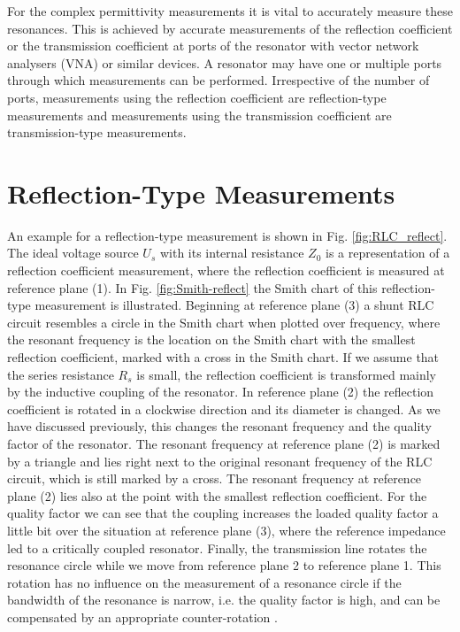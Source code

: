 For the complex permittivity measurements it is vital to accurately measure these resonances. This is achieved by accurate measurements of the reflection coefficient or the transmission coefficient at ports of the resonator with vector network analysers (VNA) or similar devices. A resonator may have one or multiple ports through which measurements can be performed. Irrespective of the number of ports, measurements using the reflection coefficient are reflection-type measurements and measurements using the transmission coefficient are transmission-type measurements. 

\section{Reflection-Type Measurements}
An example for a reflection-type measurement is shown in Fig. \ref{fig:RLC_reflect}. The ideal voltage source $U_s$ with its internal resistance $Z_0$ is a representation of a reflection coefficient measurement, where the reflection coefficient is measured at reference plane (1). In Fig. \ref{fig:Smith-reflect} the Smith chart of this reflection-type measurement is illustrated. Beginning at reference plane (3) a shunt RLC circuit resembles a circle in the Smith chart when plotted over frequency, where the resonant frequency is the location on the Smith chart with the smallest reflection coefficient, marked with a cross in the Smith chart. If we assume that the series resistance $R_s$ is small, the reflection coefficient is transformed mainly by the inductive coupling of the resonator. In reference plane (2) the reflection coefficient is rotated in a clockwise direction and its diameter is changed. As we have discussed previously, this changes the resonant frequency and the quality factor of the resonator.  The resonant frequency at reference plane (2) is marked by a triangle and lies right next to the original resonant frequency of the RLC circuit, which is still marked by a cross. The resonant frequency at reference plane (2) lies also at the point with the smallest reflection coefficient. For the quality factor we can see that the coupling increases the loaded quality factor a little bit over the situation at reference plane (3), where the reference impedance led to a critically coupled resonator. Finally, the transmission line rotates the resonance circle while we move from reference plane 2 to reference plane 1. This rotation has no influence on the measurement of a resonance circle if the bandwidth of the resonance is narrow, i.e. the quality factor is high, and can be compensated by an appropriate counter-rotation \cite{kajfez}.

